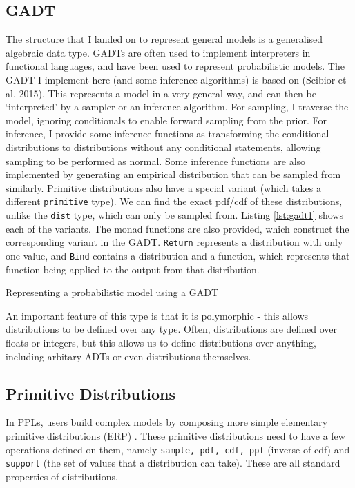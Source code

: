 \subsection{GADT} \label{sec:gadt}
The structure that I landed on to represent general models is a generalised algebraic data type. GADTs are often used to implement interpreters in functional languages, and have been used to represent probabilistic models. The GADT I implement here (and some inference algorithms) is based on (Scibior et al. 2015)\cite{scibior2015practical}. This represents a model in a very general way, and can then be `interpreted' by a sampler or an inference algorithm. For sampling, I traverse the model, ignoring conditionals to enable forward sampling from the prior. For inference, I provide some inference functions as transforming the conditional distributions to distributions without any conditional statements, allowing sampling to be performed as normal. Some inference functions are also implemented by generating an empirical distribution that can be sampled from similarly. Primitive distributions also have a special variant (which takes a different \texttt{primitive} type). We can find the exact pdf/cdf of these distributions, unlike the \texttt{dist} type, which can only be sampled from. Listing \ref{lst:gadt1} shows each of the variants. The monad functions are also provided, which construct the corresponding variant in the GADT. \texttt{Return} represents a distribution with only one value, and \texttt{Bind} contains a distribution and a function, which represents that function being applied to the output from that distribution.

\begin{listing}[!ht]
	\caption{Representing a probabilistic model using a GADT}
	\label{lst:gadt1}
\end{listing}

An important feature of this type is that it is polymorphic - this allows distributions to be defined over any type. Often, distributions are defined over floats or integers, but this allows us to define distributions over anything, including arbitary ADTs or even distributions themselves.

\subsection{Primitive Distributions}
In PPLs, users build complex models by composing more simple elementary primitive distributions (ERP) \cite{pmlr-v15-wingate11a}. These primitive distributions need to have a few operations defined on them, namely \texttt{sample, pdf, cdf, ppf} (inverse of cdf) and \texttt{support} (the set of values that a distribution can take). These are all standard properties of distributions.

